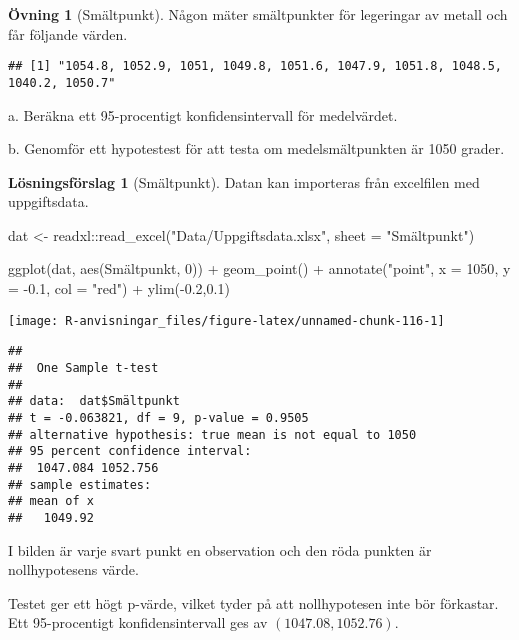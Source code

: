 \documentclass[
]{book}
\newenvironment{Shaded}{\begin{snugshade}}{\end{snugshade}}
\newcommand{\AttributeTok}[1]{\textcolor[rgb]{0.77,0.63,0.00}{#1}}
\newcommand{\DecValTok}[1]{\textcolor[rgb]{0.00,0.00,0.81}{#1}}
\newcommand{\FloatTok}[1]{\textcolor[rgb]{0.00,0.00,0.81}{#1}}
\newcommand{\FunctionTok}[1]{\textcolor[rgb]{0.00,0.00,0.00}{#1}}
\newcommand{\NormalTok}[1]{#1}
\newcommand{\OtherTok}[1]{\textcolor[rgb]{0.56,0.35,0.01}{#1}}
\newcommand{\SpecialCharTok}[1]{\textcolor[rgb]{0.00,0.00,0.00}{#1}}
\newcommand{\StringTok}[1]{\textcolor[rgb]{0.31,0.60,0.02}{#1}}
\theoremstyle{definition}
\theoremstyle{definition}
\theoremstyle{definition}
\newtheorem{exercise}{Övning}[chapter]
\theoremstyle{definition}
\newtheorem{hypothesis}{Lösningsförslag}[chapter]
\theoremstyle{remark}
\begin{document}
\begin{exercise}[Smältpunkt]
Någon mäter smältpunkter för legeringar av metall och får följande värden.

\begin{verbatim}
## [1] "1054.8, 1052.9, 1051, 1049.8, 1051.6, 1047.9, 1051.8, 1048.5, 1040.2, 1050.7"
\end{verbatim}

a. Beräkna ett 95-procentigt konfidensintervall för medelvärdet.

b. Genomför ett hypotestest för att testa om medelsmältpunkten är 1050 grader.
\end{exercise}

\begin{hypothesis}[Smältpunkt]
Datan kan importeras från excelfilen med uppgiftsdata.

\begin{Shaded}
\begin{Highlighting}[]
\NormalTok{dat }\OtherTok{\textless{}{-}}\NormalTok{ readxl}\SpecialCharTok{::}\FunctionTok{read\_excel}\NormalTok{(}\StringTok{"Data/Uppgiftsdata.xlsx"}\NormalTok{, }\AttributeTok{sheet =} \StringTok{"Smältpunkt"}\NormalTok{)}

\FunctionTok{ggplot}\NormalTok{(dat, }\FunctionTok{aes}\NormalTok{(Smältpunkt, }\DecValTok{0}\NormalTok{)) }\SpecialCharTok{+}
  \FunctionTok{geom\_point}\NormalTok{() }\SpecialCharTok{+}
  \FunctionTok{annotate}\NormalTok{(}\StringTok{"point"}\NormalTok{, }\AttributeTok{x =} \DecValTok{1050}\NormalTok{, }\AttributeTok{y =} \SpecialCharTok{{-}}\FloatTok{0.1}\NormalTok{, }\AttributeTok{col =} \StringTok{"red"}\NormalTok{) }\SpecialCharTok{+}
  \FunctionTok{ylim}\NormalTok{(}\SpecialCharTok{{-}}\FloatTok{0.2}\NormalTok{,}\FloatTok{0.1}\NormalTok{)}
\end{Highlighting}
\end{Shaded}

\begin{center}\texttt{[image: R-anvisningar\_files/figure-latex/unnamed-chunk-116-1]} \end{center}

\begin{Shaded}
\end{Shaded}

\begin{verbatim}
## 
##  One Sample t-test
## 
## data:  dat$Smältpunkt
## t = -0.063821, df = 9, p-value = 0.9505
## alternative hypothesis: true mean is not equal to 1050
## 95 percent confidence interval:
##  1047.084 1052.756
## sample estimates:
## mean of x 
##   1049.92
\end{verbatim}

I bilden är varje svart punkt en observation och den röda punkten är nollhypotesens värde.

Testet ger ett högt p-värde, vilket tyder på att nollhypotesen inte bör förkastar. Ett 95-procentigt konfidensintervall ges av \((1047.08, 1052.76)\).
\end{hypothesis}
\end{document}
